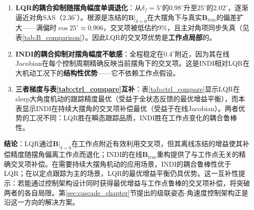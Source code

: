 \begin{enumerate}[label=(\arabic*)]
    \item \textbf{LQR的耦合抑制随摆角幅度单调退化}：从$\delta_f=5^\circ$的$0.98^\circ$升至$25^\circ$的$2.02^\circ$，逐渐逼近对角SAS（$2.36^\circ$）。根源是冻结的$\mathbf{B}|_{\delta=0}$在大摆角下与真实$\mathbf{B}_{\mathrm{true}}$的偏差扩大——满偏时$\cos 25^\circ\approx0.906$，交叉项被低估约$9\%$，且主对角项同步失真（见表\ref{tab:B_comparison}）。因此LQR的交叉项优势是\textbf{工作点局部}的。
    \item \textbf{INDI的耦合抑制对摆角幅度不敏感}：全程稳定在$0.4^\circ$附近，因为其在线Jacobian在每个控制周期精确反映当前摆角下的交叉项。这是INDI相对LQR在大机动工况下的\textbf{结构性优势}——它不依赖工作点假设。
    \item \textbf{三者梯度与表\ref{tab:ctrl_compare}互补}：表\ref{tab:ctrl_compare}显示LQR在slerp大角度机动的跟踪精度最优（受益于全状态反馈的最优增益平衡），而本表显示INDI在持续大摆角的交叉项补偿最优（受益于在线Jacobian）。两者优势的工况不同：LQR胜在瞬态跟踪品质，INDI胜在工作点变化的耦合鲁棒性。
\end{enumerate}

\textbf{结论}：LQR通过$\mathbf{B}|_{\delta=0}$在工作点附近有效利用交叉项，但其离线冻结的增益使其补偿精度随摆角偏离工作点而退化；INDI的在线$\mathbf{B}_{\mathrm{true}}$重构提供了与工作点无关的精确交叉项补偿。在需要持续大摆角机动的应用场景，INDI的耦合鲁棒性优于LQR；在以定点跟踪为主的场景，LQR的最优增益平衡仍具优势。这一互补性提示：若能通过控制架构设计同时获得最优增益与工作点鲁棒的交叉项补偿，将突破两者的各自局限。第\ref{sec:cascade_chapter}节提出的级联姿态-角速度控制架构正是沿这一方向的解决方案。

